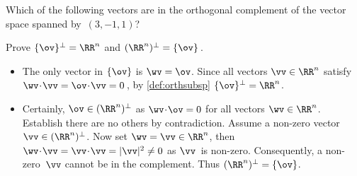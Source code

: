 \begin{activity}
Which of the following vectors are in the orthogonal complement of the vector space spanned by~\((3,-1,1)\)?
\end{activity}



\begin{example} \label{eg:}
Prove \(\{\ov\}^\perp=\RR^n\) and \((\RR^n)^\perp=\{\ov\}\)\,.
\begin{solution} 
\begin{itemize}
\item The only vector in \(\{\ov\}\) is \(\wv=\ov\).
Since all vectors \(\vv\in\RR^n\) satisfy \(\wv\cdot\vv=\ov\cdot\vv=0\)\,, by \autoref{def:orthsubsp} \(\{\ov\}^\perp=\RR^n\).

\item Certainly, \(\ov\in(\RR^n)^\perp\) as \(\wv\cdot\ov=0\) for all vectors \(\wv\in\RR^n\).
Establish there are no others by contradiction.
Assume a non-zero vector \(\vv\in(\RR^n)^\perp\).
Now set \(\wv=\vv\in\RR^n\), then \(\wv\cdot\vv=\vv\cdot\vv=|\vv|^2\neq0\) as \(\vv\)~is non-zero.
Consequently, a non-zero~\(\vv\) cannot be in the complement.
Thus \((\RR^n)^\perp=\{\ov\}\).
\end{itemize}
\end{solution}
\end{example}




%
%
%

